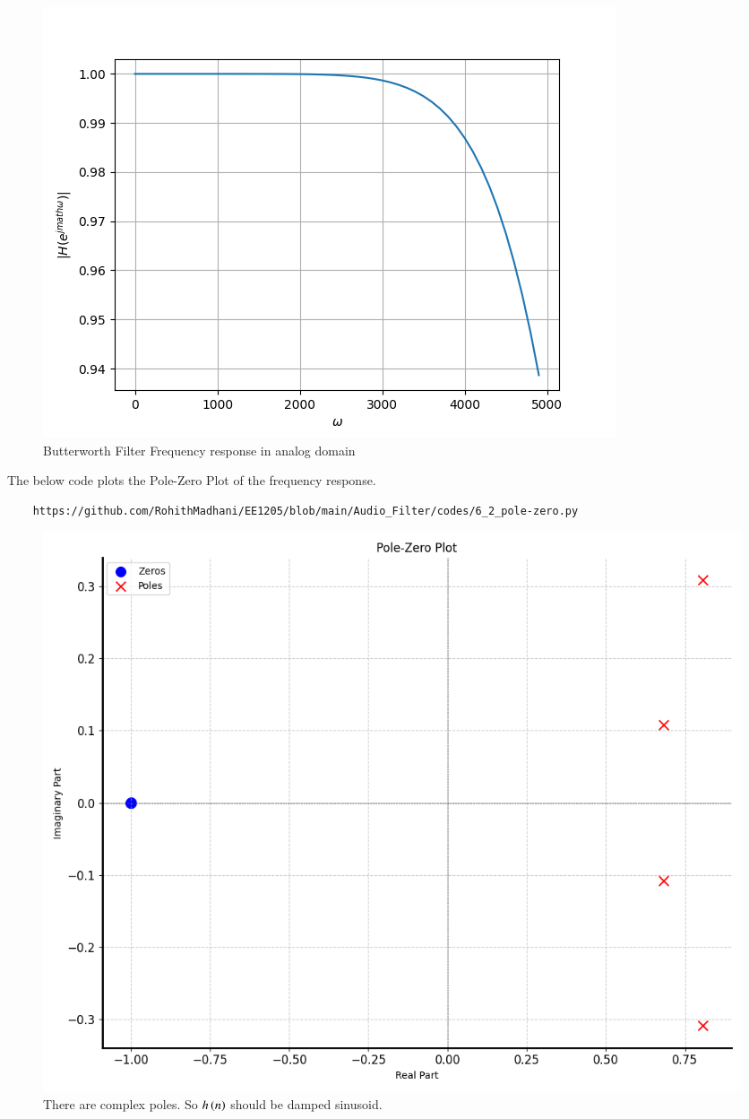\documentclass[journal,12pt,twocolumn]{IEEEtran}
\theoremstyle{remark}
\begin{document}
\begin{enumerate}[label=\thesection.\arabic*]
\begin{figure}[H]
\includegraphics[width=1\columnwidth]{figs/Butterworth_analog.png}
\caption{Butterworth Filter Frequency response in analog domain}
\label{fig:H(w)_6}
\end{figure}



The below code plots the Pole-Zero Plot of the frequency response.
\begin{lstlisting}
    https://github.com/RohithMadhani/EE1205/blob/main/Audio_Filter/codes/6_2_pole-zero.py
\end{lstlisting}
\begin{figure}[H]
\centering
\includegraphics[width=1\columnwidth]{figs/Pole_Zero_Plt.png}
\caption{There are complex poles. So $h\left(n\right)$ should be damped sinusoid.}
\label{fig:pole_zero_6.2}
\end{figure}


\end{enumerate}
\end{document}

